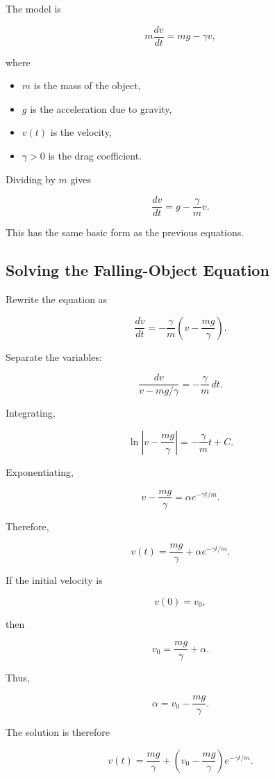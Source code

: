 \documentclass[11pt]{article}
\begin{document}
The model is

\[
m\frac{dv}{dt}=mg-\gamma v,
\]

where

\begin{itemize}
    \item $m$ is the mass of the object,
    \item $g$ is the acceleration due to gravity,
    \item $v(t)$ is the velocity,
    \item $\gamma>0$ is the drag coefficient.
\end{itemize}

Dividing by $m$ gives

\[
\frac{dv}{dt}
=
g-\frac{\gamma}{m}v.
\]

This has the same basic form as the previous equations.

\subsection{Solving the Falling-Object Equation}

Rewrite the equation as

\[
\frac{dv}{dt}
=
-\frac{\gamma}{m}
\left(
v-\frac{mg}{\gamma}
\right).
\]

Separate the variables:

\[
\frac{dv}
{v-mg/\gamma}
=
-\frac{\gamma}{m}\,dt.
\]

Integrating,

\[
\ln\left|
v-\frac{mg}{\gamma}
\right|
=
-\frac{\gamma}{m}t+C.
\]

Exponentiating,

\[
v-\frac{mg}{\gamma}
=
\alpha e^{-\gamma t/m}.
\]

Therefore,

\[
v(t)
=
\frac{mg}{\gamma}
+
\alpha e^{-\gamma t/m}.
\]

If the initial velocity is

\[
v(0)=v_0,
\]

then

\[
v_0
=
\frac{mg}{\gamma}
+
\alpha.
\]

Thus,

\[
\alpha
=
v_0-\frac{mg}{\gamma}.
\]

The solution is therefore

\[
\boxed{
v(t)
=
\frac{mg}{\gamma}
+
\left(
v_0-\frac{mg}{\gamma}
\right)
e^{-\gamma t/m}
}.
\]
\end{document}
